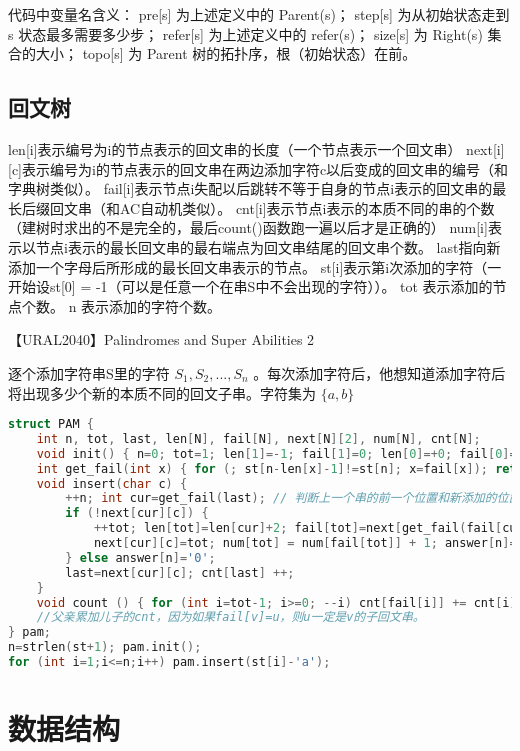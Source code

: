 \documentclass{article}
\begin{document}
代码中变量名含义：
 pre[s] 为上述定义中的 Parent(s)；
 step[s] 为从初始状态走到 s 状态最多需要多少步；
 refer[s] 为上述定义中的 refer(s)；
 size[s] 为 Right(s) 集合的大小；
 topo[s] 为 Parent 树的拓扑序，根（初始状态）在前。

\subsection{回文树}

 len[i]表示编号为i的节点表示的回文串的长度（一个节点表示一个回文串）
 next[i][c]表示编号为i的节点表示的回文串在两边添加字符c以后变成的回文串的编号（和字典树类似）。
 fail[i]表示节点i失配以后跳转不等于自身的节点i表示的回文串的最长后缀回文串（和AC自动机类似）。
 cnt[i]表示节点i表示的本质不同的串的个数（建树时求出的不是完全的，最后count()函数跑一遍以后才是正确的）
 num[i]表示以节点i表示的最长回文串的最右端点为回文串结尾的回文串个数。
 last指向新添加一个字母后所形成的最长回文串表示的节点。
 st[i]表示第i次添加的字符（一开始设st[0] = -1（可以是任意一个在串S中不会出现的字符））。
 tot 表示添加的节点个数。
 n 表示添加的字符个数。

【URAL2040】Palindromes and Super Abilities 2

逐个添加字符串S里的字符 $S_1, S_2, ..., S_n$ 。每次添加字符后，他想知道添加字符后将出现多少个新的本质不同的回文子串。字符集为 $\{a, b\}$

\begin{lstlisting}[language=C++]
struct PAM {
	int n, tot, last, len[N], fail[N], next[N][2], num[N], cnt[N];
	void init() { n=0; tot=1; len[1]=-1; fail[1]=0; len[0]=+0; fail[0]=1; last=1; }
	int get_fail(int x) { for (; st[n-len[x]-1]!=st[n]; x=fail[x]); return x; }
	void insert(char c) {
		++n; int cur=get_fail(last); // 判断上一个串的前一个位置和新添加的位置是否相同，相同则说明构成回文。否则找 fail 指针。
		if (!next[cur][c]) {
			++tot; len[tot]=len[cur]+2; fail[tot]=next[get_fail(fail[cur])][c];
			next[cur][c]=tot; num[tot] = num[fail[tot]] + 1; answer[n]='1';
		} else answer[n]='0';
		last=next[cur][c]; cnt[last] ++;
	}
	void count () { for (int i=tot-1; i>=0; --i) cnt[fail[i]] += cnt[i]; }
	//父亲累加儿子的cnt，因为如果fail[v]=u，则u一定是v的子回文串。
} pam;
n=strlen(st+1); pam.init();
for (int i=1;i<=n;i++) pam.insert(st[i]-'a');
\end{lstlisting}

\section{数据结构}
\end{document}
